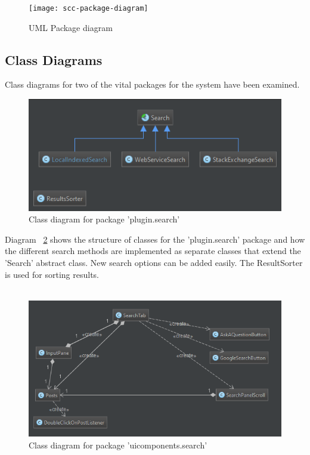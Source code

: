 \documentclass{l4proj}
\begin{document}
\begin{figure}[H]
\texttt{[image: scc-package-diagram]}
\centering
\caption{UML Package diagram}
\label{fig:scc-package-diagram}
\end{figure}

\newpage
\subsection{Class Diagrams}

Class diagrams for two of the vital packages for the system have been examined.

\begin{figure}[H]
\includegraphics[scale=0.8]{search-classdiagram}
\centering
\caption{Class diagram for package 'plugin.search'}
\label{fig:search-classdiagram}
\end{figure}

\noindent
Diagram ~\ref{fig:search-classdiagram} shows the structure of classes for the 'plugin.search' package and how the different search methods are implemented as separate classes that extend the 'Search' abstract class. New search options can be added easily. The ResultSorter is used for sorting results.
\\
\\
\begin{figure}[H]
\includegraphics[scale=0.8]{searchtab-classdiagram}
\centering
\caption{Class diagram for package 'uicomponents.search'}
\label{fig:searchtab-classdiagram}
\end{figure}
\end{document}

